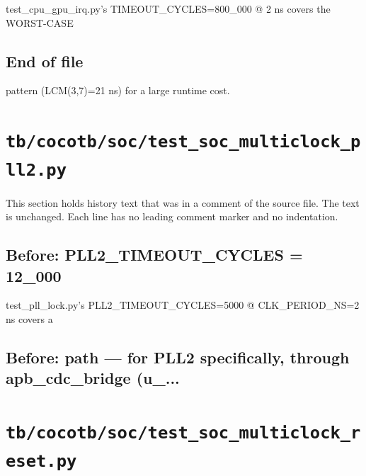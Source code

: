 \begin{record}
\begin{textblock}
test_cpu_gpu_irq.py's TIMEOUT_CYCLES=800_000 @ 2 ns covers the WORST-CASE
\end{textblock}

\subsection*{End of file}

\begin{textblock}
  pattern (LCM(3,7)=21 ns) for a large runtime cost.
\end{textblock}

\end{record}

\section{\texttt{tb/cocotb/soc/test\_soc\_multiclock\_pll2.py}}\label{cr:suite:soc-test-soc-multiclock-pll2}

This section holds history text that was in a comment of the source file. The text is unchanged. Each line has no leading comment marker and no indentation.

\begin{record}

\subsection*{Before: PLL2\_TIMEOUT\_CYCLES = 12\_000}

\begin{textblock}
test_pll_lock.py's PLL2_TIMEOUT_CYCLES=5000 @ CLK_PERIOD_NS=2 ns covers a
\end{textblock}

\subsection*{Before: path — for PLL2 specifically, through apb\_cdc\_bridge (u\_...}


\end{record}

\section{\texttt{tb/cocotb/soc/test\_soc\_multiclock\_reset.py}}\label{cr:suite:soc-test-soc-multiclock-reset}


